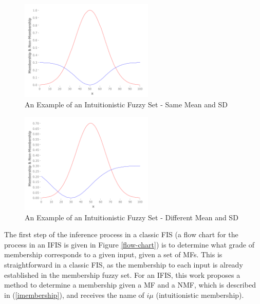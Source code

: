 \documentclass[conference]{IEEEtran}
\begin{document}
\begin{figure}[!t]
  \centering
  \includegraphics[width=2.5in]{ifs}
  \caption{An Example of an Intuitionistic Fuzzy Set - Same Mean and SD}
  \label{ifs}
\end{figure}

\begin{figure}[!t]
  \centering
  \includegraphics[width=2.5in]{ifs-diff-mu-sd}
  \caption{An Example of an Intuitionistic Fuzzy Set - Different Mean
    and SD}
  \label{ifs-diff-mu-sd}
\end{figure}

The first step of the inference process in a classic FIS (a flow chart
for the process in an IFIS is given in Figure \ref{flow-chart}) is to
determine what grade of membership corresponds to a given input, given a set of
MFs. This is straightforward in a classic FIS, as the
membership to each input is already established in the membership
fuzzy set. For an IFIS, this work proposes a method to determine a
membership given a MF and a NMF,
which is described in (\ref{imembership}), and receives the name of
$i\mu$ (intuitionistic membership). %
\end{document}
